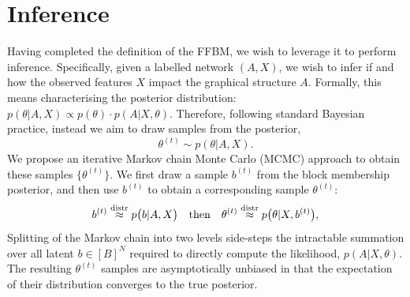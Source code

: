 \section{Inference}
\label{sec:inference}

Having completed the definition of the FFBM, we wish to leverage it 
to perform inference. Specifically, given a labelled network $(A, X)$, we wish to infer if and how the observed features $X$ impact the graphical structure $A$. Formally,
this means characterising the posterior distribution:
$
p(\theta|A, X) \propto p(\theta) \cdot p(A | X, \theta).
$
Therefore, following standard Bayesian practice,
instead we aim to draw samples from the posterior,
%
\begin{equation}
	\label{eqn:theta-target}
	\theta^{(t)} \sim p(\theta | A, X).
\end{equation}
%
We propose an iterative Markov chain Monte Carlo
(MCMC) approach to obtain these samples
$\{\theta^{(t)}\}$. We first draw a sample $b^{(t)}$ 
from the block membership posterior,
and then use $b^{(t)}$ to obtain a corresponding
sample $\theta^{(t)}$:
%
\begin{equation}
	b^{(t)} \stackrel{\rm distr}{\approx} p \big( b | A, X \big) 
	\quad \textrm{then} \quad
	\theta^{(t)} \stackrel{\rm distr}{\approx} 
	p\big(\theta | X, b^{(t)} \big),
\end{equation}
%
Splitting of the Markov chain into two levels side-steps the intractable summation over
all latent $b \in [B]^N$ required to directly compute the likelihood, $p(A| X, \theta)$.
The resulting $\theta^{(t)}$ samples are asymptotically
unbiased in that the expectation of 
their distribution converges to the true posterior.
%
